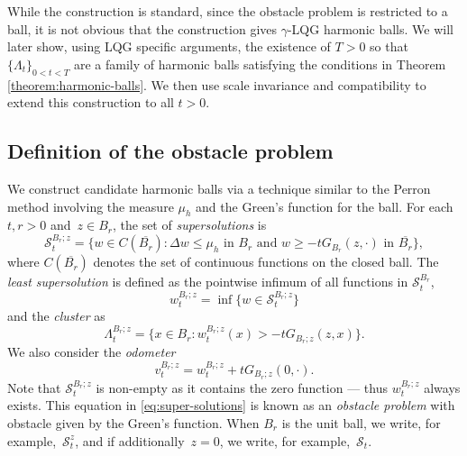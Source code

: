 \documentclass[12pt]{amsart}
\numberwithin{equation}{section}
\newcommand{\mclS}[2]{\hyperref[eq:super-solutions]{\mathcal{S}^{#1}_{#2}}}
\newcommand{\lss}[2]{\hyperref[eq:least-super-solution]{w^{#1}_{#2}}}
\newcommand{\cluster}[2]{\hyperref[eq:non-co-set]{\mathit{\Lambda}^{#1}_{#2}}}
\newcommand{\odometer}[2]{\hyperref[eq:limit-odometer]{v^{#1}_{#2}}}
\begin{document}
	While the construction is standard, since the obstacle problem is restricted to a ball, it is not obvious that the construction gives $\gamma$-LQG harmonic balls. We will later show, using LQG specific arguments, the existence of $T > 0$ so that $\{{\cluster{}{t}}\}_{0 < t < T}$ are a family of harmonic balls satisfying the conditions in Theorem 
	\ref{theorem:harmonic-balls}. We then use scale invariance and compatibility to extend this construction to all $t > 0$.
	
	
	
	
	
	
	\subsection{Definition of the obstacle problem} \label{subsec:obstacle-def} 
	We construct candidate harmonic balls via a technique similar to the Perron method involving the measure $\mu_h$ and the Green's function for the ball.
	For each $t, r > 0$ and~$z \in B_r$,  the set of {\it supersolutions}
	is 
	\begin{equation} \label{eq:super-solutions}
	\mclS{B_r; z}{t}  = \{ w \in C(\overline{B_r}) :  \Delta w \leq \mu_h \mbox{ in $B_r$}  \mbox{ and }  w \geq  -t G_{B_r}(z, \cdot) \mbox{ in $\overline{B_r}$}\},
	\end{equation}
	where $C(\overline{B_r})$ denotes the set of continuous functions on the closed ball.
	The {\it least supersolution} is defined as the pointwise infimum of all functions in $\mclS{B_r}{t}$, 
	\begin{equation} \label{eq:least-super-solution}
	\lss{B_r; z}{t} = \inf\{ w \in \mclS{B_r;z }{t} \}
	\end{equation}
	and the {\it cluster} as
	\begin{equation} \label{eq:non-co-set}
	\cluster{B_r; z}{t} = \{ x \in B_r : \lss{B_r; z}{t}(x) > -t G_{B_r; z}(z, x) \}.
	\end{equation}
	We also consider the {\it odometer}	
	\begin{equation} \label{eq:limit-odometer}
	\odometer{B_r; z}{t} = \lss{B_r; z}{t}  + t G_{B_r; z}(0, \cdot).
	\end{equation}
	Note that $\mclS{B_r; z}{t}$ is non-empty as it contains the zero function --- thus $\lss{B_r; z}{t}$ always exists.
	This equation in \eqref{eq:super-solutions} is known as an {\it obstacle problem} with obstacle given by the Green's function.
	When $B_r$ is the unit ball, we write, for example,~$\mclS{z}{t}$, and if additionally~$z = 0$, we write, for example,~$\mclS{}{t}$.
	
\end{document}
